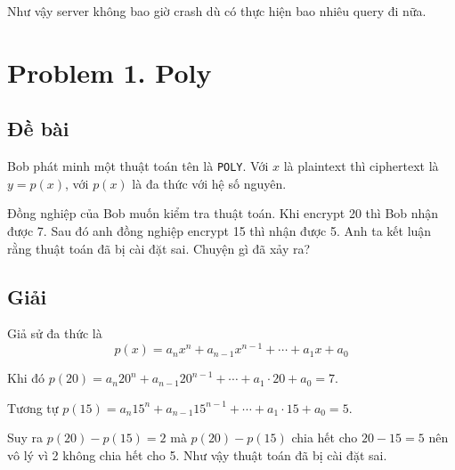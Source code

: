 Như vậy server không bao giờ crash dù có thực hiện bao nhiêu query đi nữa.

\section*{Problem 1. Poly}

\subsection*{Đề bài}

Bob phát minh một thuật toán tên là \texttt{POLY}. Với $x$ là plaintext thì ciphertext là $y = p(x)$, với $p(x)$ là đa thức với hệ số nguyên.

Đồng nghiệp của Bob muốn kiểm tra thuật toán. Khi encrypt 20 thì Bob nhận được 7. Sau đó anh đồng nghiệp encrypt 15 thì nhận được 5. Anh ta kết luận rằng thuật toán đã bị cài đặt sai. Chuyện gì đã xảy ra?

\subsection*{Giải}

Giả sử đa thức là \[ p(x) = a_n x^n + a_{n-1} x^{n-1} + \cdots + a_1 x + a_0 \]

Khi đó $p(20) = a_n 20^n + a_{n-1} 20^{n-1} + \cdots + a_1 \cdot 20 + a_0 = 7$.

Tương tự $p(15) = a_n 15^n + a_{n-1} 15^{n-1} + \cdots + a_1 \cdot 15 + a_0 = 5$.

Suy ra $p(20) - p(15) = 2$ mà $p(20) - p(15)$ chia hết cho $20 - 15 = 5$ nên vô lý vì 2 không chia hết cho 5. Như vậy thuật toán đã bị cài đặt sai.

